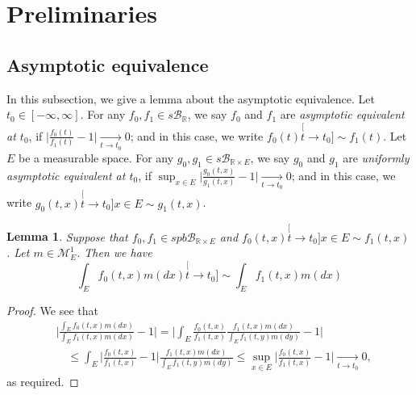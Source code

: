 \documentclass[12pt, a4paper]{amsart}
\newtheorem{lem}[thm]{Lemma}
\theoremstyle{definition}
\numberwithin{equation}{section}
\begin{document}
\section{Preliminaries}
\label{sec: Preliminaries}

\subsection{Asymptotic equivalence}
\label{sec: Asymptotic equivalence}
	In this subsection, we give a lemma about the asymptotic equivalence.	
	Let $t_0 \in [-\infty,\infty]$.
	For any $f_0, f_1\in s\mathscr B_{\mathbb R}$, we say $f_0$ and $f_1$ are \emph{asymptotic equivalent at $t_0$}, if $\big|\frac{f_0(t)}{f_1(t)} - 1\big| \xrightarrow[t\to t_0]{} 0$;
	and in this case, we write $f_0(t) \stackrel[t\to t_0]{}{\sim} f_1(t)$.
	Let $E$ be a measurable space.
	For any $g_0, g_1\in s\mathscr B_{\mathbb R\times E}$, we say $g_0$ and $g_1$ are \emph{uniformly asymptotic equivalent at $t_0$}, if $\sup_{x\in E}\big|\frac{g_0(t,x)}{g_1(t,x)} - 1\big| \xrightarrow[t\to t_0]{} 0$; and in this case, we write $g_0(t,x)\stackrel[t\to t_0]{x\in E}{\sim}g_1(t,x)$.

\begin{lem}
\label{lem: asymptotic equivalent of integration}
	Suppose that $f_0,f_1\in spb\mathscr B_{\mathbb R \times E}$ and $f_0(t,x)\stackrel[t\to t_0]{x\in E}{\sim}f_1(t,x)$.
	Let $m \in \mathcal M^1_E$. Then we have 
\[
	\int_E f_0(t,x)m(dx) 
	\stackrel[t\to t_0]{}{\sim}
	\int_E f_1(t,x)m(dx) 
\]
\end{lem}
\begin{proof}
	We see that
\[\begin{split}
	&\Big| \frac{	\int_E f_0(t,x)m(dx) }{ 	\int_E f_1(t,x)m(dx)  } - 1 \Big|
	= \Big| \int_E \frac{f_0(t,x)}{f_1(t,x)} \frac{f_1(t,x)m(dx)}{	\int_E f_1(t,y)m(dy)  } - 1\Big|
	\\&\quad \leq \int_E \Big|  \frac{f_0(t,x)}{f_1(t,x)} - 1 \Big| \frac{f_1(t,x)m(dx)}{	\int_E f_1(t,y)m(dy)  } 
	\leq \sup_{x\in E} \Big|  \frac{f_0(t,x)}{f_1(t,x)} - 1 \Big| 
	\xrightarrow[t\to t_0]{} 0,
\end{split}\]
	as required.
\end{proof}
\end{document}
